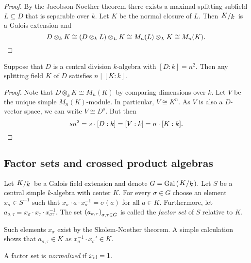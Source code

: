 \begin{proof}
By the Jacobson-Noether theorem there exists a maximal splitting
subfield $L \subseteq D$ that is separable over $k$. Let $K$ be the
normal closure of $L$. Then $\kvoc{K}{k}$ is a Galois extension and
\[
D \otimes_k K \cong
(D \otimes_k L) \otimes_L K \cong
M_n(L) \otimes_L K \cong
M_n(K). \qedhere
\]
\end{proof}

\begin{posledica}
Suppose that $D$ is a central division $k$-algebra with
$[D : k] = n^2$. Then any splitting field $K$ of $D$ satisfies
$n \mid [K : k]$.
\end{posledica}

\begin{proof}
Note that $D \otimes_k K \cong M_n(K)$ by comparing dimensions over
$k$. Let $V$ be the unique simple $M_n(K)$-module. In particular,
$V \cong K^n$. As $V$ is also a $D$-vector space, we can write
$V \cong D^s$. But then
\[
s n^2 =
s \cdot [D : k] =
[V : k] =
n \cdot [K : k]. \qedhere
\]
\end{proof}

\newpage

\subsection{Factor sets and crossed product algebras}

\begin{definicija}
Let $\kvoc{K}{k}$ be a Galois field extension and denote
$G = \Gal \br{\kvoc{K}{k}}$. Let $S$ be a central simple
$k$-algebra with center $K$. For every $\sigma \in G$ choose an
element $x_\sigma \in S^{-1}$ such that
$x_\sigma \cdot a \cdot x_\sigma^{-1} = \sigma(a)$ for all
$a \in K$. Furthermore, let
$a_{\sigma, \tau} =
x_\sigma \cdot x_\tau \cdot x_{\sigma \tau}^{-1}$. The set
$\left(a_{\sigma, \tau}\right)_{\sigma, \tau \in G}$ is called the
\emph{factor set} of $S$ relative to $K$.
\end{definicija}

\begin{opomba}
Such elements $x_\sigma$ exist by the Skolem-Noether theorem. A
simple calculation shows that $a_{\sigma, \tau} \in K$ as
$x_\sigma^{-1} \cdot x_\sigma' \in K$.
\end{opomba}

\begin{definicija}
A factor set is \emph{normalized} if
$x_{\operatorname{id}} = 1$.
\end{definicija}

